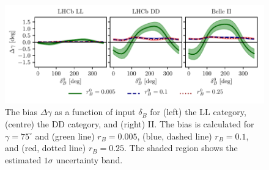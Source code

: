 \begin{figure}[tbp]
    \centering
    \includegraphics{figures/ks_chapter/delta_scan_Belle2018_50_g.pdf}
    \caption{The bias $\Delta \gamma$ as a function of input $\delta_B$ for (left) the LL \lhcb category, (centre) the DD \lhcb category, and (right) \belle II. The bias is calculated for $\gamma=75^\circ$ and (green line) $r_B=0.005$, (blue, dashed line) $r_B=0.1$, and (red, dotted line) $r_B=0.25$. The shaded region shows the estimated $1\sigma$ uncertainty band.}
    \label{fig:delta_scan}
\end{figure}


